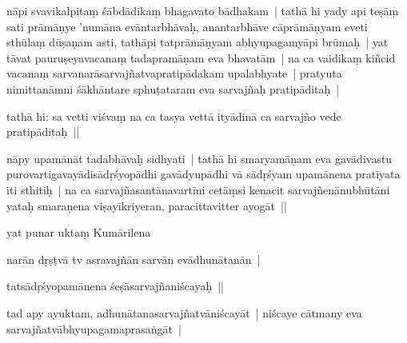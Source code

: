 \documentclass[article,12pt,a4paper]{memoir}%
\newcounter{parCount}
\begin{document}
	  
	  \pstart \leavevmode%
	\label{thakur75-27.20}nāpi svavikalpitaṃ śābdādikaṃ bhagavato bādhakam | tathā hi yady api teṣāṃ sati prāmāṇye 'numāna evāntarbhāvaḥ, anantarbhāve cāprāmāṇyam eveti sthūlaṃ dūṣaṇam asti, tathāpi tatprāmāṇyam abhyupagamyāpi brūmaḥ | yat tāvat pauruṣeyavacanaṃ tadapramāṇam eva bhavatām | na ca vaidikaṃ kiñcid vacanaṃ sarvanarāsarvajñatvapratipādakam upalabhyate | pratyuta nimittanāmni śākhāntare sphuṭataram eva sarvajñaḥ pratipāditaḥ | 
	{}
	\pend%
      

	  
	  \pstart \leavevmode%
	tathā hi: sa vetti viśvaṃ na ca tasya vettā ityādinā ca sarvajño vede pratipāditaḥ || 
	{}
	\pend%
      

	  
	  \pstart \leavevmode%
	nāpy upamānāt tadabhāvaḥ sidhyati | tathā hi smaryamāṇam eva gavādivastu purovartigavayādisādṛśyopādhi gavādyupādhi vā sādṛśyam upamānena pratīyata iti sthitiḥ | na ca sarvajñasantānavartīni cetāṃsi kenacit sarvajñenānubhūtāni yataḥ smaraṇena viṣayīkriyeran, paracittavitter ayogāt || 
	{}
	\pend%
      

	  
	  \pstart \leavevmode%
	\label{thakur75-28.1}yat punar uktaṃ Kumārilena 
	{}
	\pend%
      

	  
	  \pstart \leavevmode%
	narān dṛṣṭvā tv asravajñān sarvān evādhunātanān | 
	{}
	\pend%
      

	  
	  \pstart \leavevmode%
	tatsādṛśyopamānena śeṣāsarvajñaniścayaḥ || 
	{}
	\pend%
      

	  
	  \pstart \leavevmode%
	tad apy ayuktam, adhunātanasarvajñatvāniścayāt | niścaye cātmany eva sarvajñatvābhyupagamaprasaṅgāt | 
	{}
	\pend%
      
\end{document}
